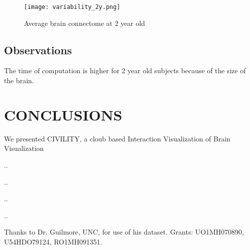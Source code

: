 \documentclass[]{spie}  %
\begin{document}
\begin{figure}
\centering 
\texttt{[image: variability\_2y.png]}
\caption[Variability brain connectome at 2 year old]{Average brain connectome at 2 year old}
\label{fig:VariabilityBrainConnectome2YearOld}
\end{figure} 


\subsection{Observations}

The time of computation is higher for 2 year old subjects because of the size of the brain.

\section{CONCLUSIONS} 

We presented CIVILITY, a cloub based Interaction Visualization of Brain Visualization

..

..

..

..

\acknowledgments

Thanks to Dr. Guilmore, UNC, for use of his dataset. Grants: UO1MH070890, U54HDO79124, RO1MH091351. 


\end{document}
